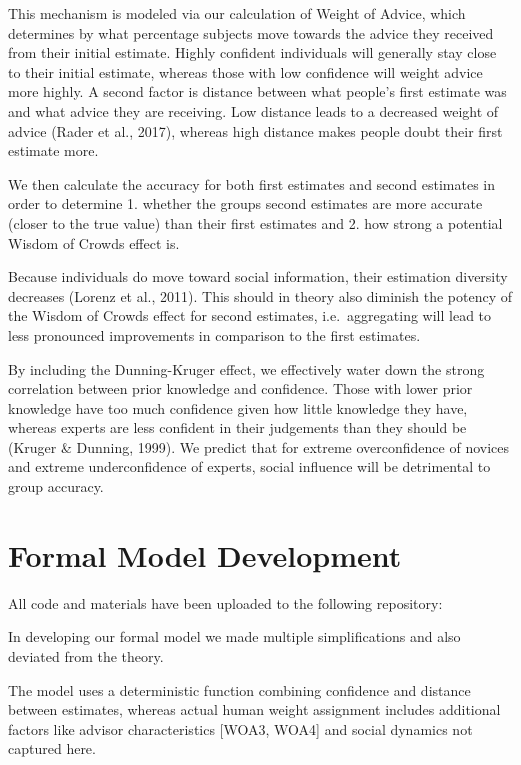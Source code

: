 \documentclass[
  man,floatsintext]{apa6}
\begin{document}
This mechanism is modeled via our calculation of Weight of Advice, which determines by what percentage subjects move towards the advice they received from their initial estimate. Highly confident individuals will generally stay close to their initial estimate, whereas those with low confidence will weight advice more highly. A second factor is distance between what people's first estimate was and what advice they are receiving. Low distance leads to a decreased weight of advice (Rader et al., 2017), whereas high distance makes people doubt their first estimate more.

We then calculate the accuracy for both first estimates and second estimates in order to determine 1. whether the groups second estimates are more accurate (closer to the true value) than their first estimates and 2. how strong a potential Wisdom of Crowds effect is.

Because individuals do move toward social information, their estimation diversity decreases (Lorenz et al., 2011). This should in theory also diminish the potency of the Wisdom of Crowds effect for second estimates, i.e.~aggregating will lead to less pronounced improvements in comparison to the first estimates.

By including the Dunning-Kruger effect, we effectively water down the strong correlation between prior knowledge and confidence. Those with lower prior knowledge have too much confidence given how little knowledge they have, whereas experts are less confident in their judgements than they should be (Kruger \& Dunning, 1999). We predict that for extreme overconfidence of novices and extreme underconfidence of experts, social influence will be detrimental to group accuracy.

\hypertarget{formal-model-development}{%
\section{Formal Model Development}\label{formal-model-development}}

All code and materials have been uploaded to the following repository:

In developing our formal model we made multiple simplifications and also deviated from the theory.

The model uses a deterministic function combining confidence and distance between estimates, whereas actual human weight assignment includes additional factors like advisor characteristics {[}WOA3, WOA4{]} and social dynamics not captured here.
\end{document}
